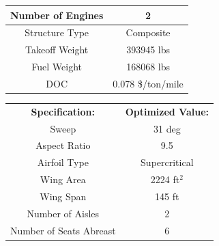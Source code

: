 \documentclass{article}
\begin{document}
\begin{table}[ht]
\begin{tabular}{|c|c|}
                \rowcolor[HTML]{C0C0C0}
                Number of Engines                  & 2                                   \\ \hline
                \rowcolor[HTML]{FFFFFF}
                Structure Type                     & Composite                           \\ \hline
                \rowcolor[HTML]{C0C0C0}
                Takeoff Weight                     & 393945 lbs                          \\ \hline
                \rowcolor[HTML]{FFFFFF}
                Fuel Weight                        & 168068 lbs                           \\ \hline
                \rowcolor[HTML]{C0C0C0}
                DOC                                & 0.078 \$/ton/mile                   \\ \hline
            \end{tabular}
            \quad
            \begin{tabular}{|c|c|}
                \hline
                \rowcolor[HTML]{DAE8FC}
                \multicolumn{2}{|c|}{\cellcolor[HTML]{DAE8FC}\textbf{One-stop Aircraft}} \\ \hline
                \textbf{Specification:}            & \textbf{Optimized Value:}           \\ \hline
                Sweep                              & 31 deg                              \\ \hline
                \rowcolor[HTML]{C0C0C0}
                Aspect Ratio                       & 9.5                                 \\ \hline
                \rowcolor[HTML]{FFFFFF}
                Airfoil Type                       & Supercritical                       \\ \hline
                \rowcolor[HTML]{C0C0C0}
                Wing Area                          & 2224 ft$^2$                             \\ \hline
                \rowcolor[HTML]{FFFFFF}
                Wing Span                          & 145 ft                              \\ \hline
                \rowcolor[HTML]{C0C0C0}
                Number of Aisles                   & 2                                   \\ \hline
                \rowcolor[HTML]{FFFFFF}
                Number of Seats Abreast            & 6                                   \\ \hline

\end{tabular}
\end{table}
\end{document}
